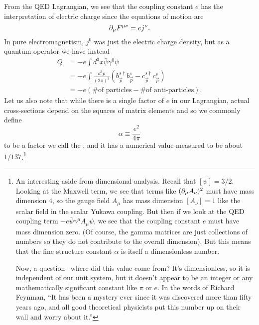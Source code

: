 From the QED Lagrangian, we see that the coupling constant $e$ has the interpretation of electric charge since the equations of motion are
$$\partial_\mu F^{\mu\nu}= ej^{\nu}.$$
In pure electromagnetism, $j^0$ was just the electric charge density, but as a quantum operator we have instead
\begin{align*}
    Q&=-e \int d^3 x \bar \psi \gamma^0 \psi \\
    &= -e \int \frac{d^3p}{(2\pi)^3} (b_{\vec p}^{s\dagger} b_{\vec p}^{s} - c_{\vec p}^{s \dagger} c_{\vec p}^s)\\
    &=-e(\text{\# of particles}-\text{\# of anti-particles}).
\end{align*}
Let us also note that while there is a single factor of $e$ in our Lagrangian, actual cross-sections depend on the squares of matrix elements and so we commonly define
\begin{equation}
    \alpha\equiv \frac{e^2}{4\pi}
\end{equation}
to be a factor we call the , and it has a numerical value measured to be about $1/137$.\footnote{An interesting aside from dimensional analysis. Recall that $[\psi]=3/2$. Looking at the Maxwell term, we see that terms like $(\partial_\mu A_\nu)^2$ must have mass dimension $4$, so the gauge field $A_\mu$ has mass dimension $[A_\nu]=1$ like the scalar field in the scalar Yukawa coupling. But then if we look at the QED coupling term $-e \bar \psi \gamma^\mu A_\mu \psi$, we see that the coupling constant $e$ must have mass dimension zero. (Of course, the gamma matrices are just collections of numbers so they do not contribute to the overall dimension). But this means that the fine structure constant $\alpha$ is itself a dimensionless number.

Now, a question-- where did this value come from? It's dimensionless, so it is independent of our unit system, but it doesn't appear to be an integer or any mathematically significant constant like $\pi$ or $e$. In the words of Richard Feynman, ``It has been a mystery ever since it was discovered more than fifty years ago, and all good theoretical physicists put this number up on their wall and worry about it.''}

